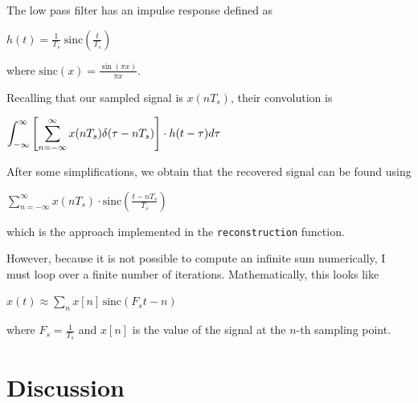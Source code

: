 \documentclass{article}
\begin{document}
The low pass filter has an impulse response defined as
\begin{center}
    \begin{math}
        h(t) = \displaystyle \frac{1}{T_s} \; \text{sinc} \left( \frac{t}{T_s} \right)
    \end{math}
\end{center}
where $\text{sinc}(x) = \frac{\sin(\pi x)}{\pi x}$.

Recalling that our sampled signal is $x(nT_s)$, their convolution is
\begin{center}
    \begin{math}
        \displaystyle \int_{-\infty}^{\infty} \displaystyle \left [ \sum_{n=-\infty}^{\infty} x(nT_s) \delta (\tau - nT_s) \displaystyle \right ] \cdot h(t - \tau) d\tau
    \end{math}
\end{center}

After some simplifications, we obtain that the recovered signal can be found using
\begin{center}
    \begin{math}
        \displaystyle \sum_{n = -\infty}^{\infty} x(nT_s) \cdot \text{sinc} \left( \frac{t-nT_s}{T_s} \right)
    \end{math}
\end{center}
which is the approach implemented in the \verb|reconstruction| function.

However, because it is not possible to compute an infinite sum numerically, I must loop over a finite number of iterations. Mathematically, this looks like
\begin{center}
    \begin{math}
        x(t) \approx \displaystyle\sum_{n}^{} x[n]\, \text{sinc}\left( F_st - n \right)
    \end{math}  
\end{center}
where $F_s = \frac{1}{T_s}$ and $x[n]$ is the value of the signal at the $n$-th sampling point.

\section{Discussion}

\end{document}
